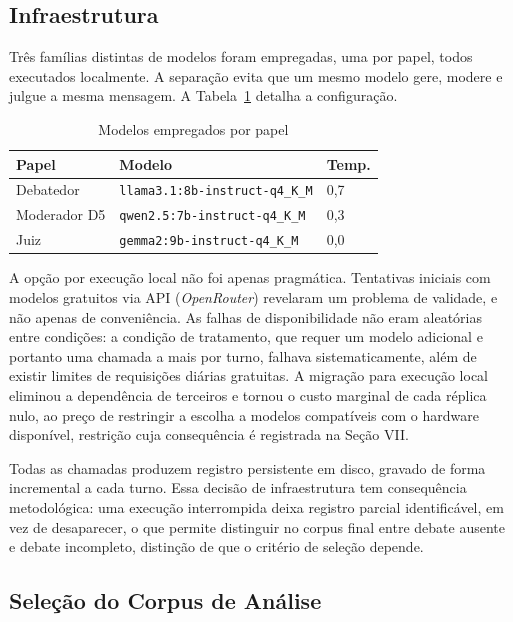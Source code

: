 \documentclass[conference]{IEEEtran} \IEEEoverridecommandlockouts %
\begin{document}
\subsection{Infraestrutura}

Três famílias distintas de modelos foram empregadas, uma por papel, todos
executados localmente. A separação evita que um mesmo modelo gere, modere e
julgue a mesma mensagem. A Tabela~\ref{tab:modelos} detalha a configuração.

\begin{table}[htbp]
\caption{Modelos empregados por papel}
\begin{center}
\begin{tabular}{@{}lll@{}}
\toprule
\textbf{Papel} & \textbf{Modelo} & \textbf{Temp.} \\
\midrule
Debatedor & \texttt{llama3.1:8b-instruct-q4\_K\_M} & 0,7 \\
Moderador D5 & \texttt{qwen2.5:7b-instruct-q4\_K\_M} & 0,3 \\
Juiz & \texttt{gemma2:9b-instruct-q4\_K\_M} & 0,0 \\
\bottomrule
\end{tabular}
\label{tab:modelos}
\end{center}
\end{table}

A opção por execução local não foi apenas pragmática. Tentativas iniciais com
modelos gratuitos via API (\textit{OpenRouter}) revelaram um problema de validade, e não apenas de
conveniência. As falhas de disponibilidade não eram aleatórias entre condições:
a condição de tratamento, que requer um modelo adicional e portanto uma
chamada a mais por turno, falhava sistematicamente, além de existir limites de requisições diárias gratuitas.
A migração para execução local eliminou a dependência de terceiros e tornou o
custo marginal de cada réplica nulo, ao preço de restringir a escolha a modelos
compatíveis com o hardware disponível, restrição cuja consequência é
registrada na Seção VII.

Todas as chamadas produzem registro persistente em disco, gravado de forma
incremental a cada turno. Essa decisão de infraestrutura tem consequência
metodológica: uma execução interrompida deixa registro parcial identificável, em
vez de desaparecer, o que permite distinguir no corpus final entre debate
ausente e debate incompleto, distinção de que o critério de seleção depende.

\subsection{Seleção do Corpus de Análise}
\end{document}
